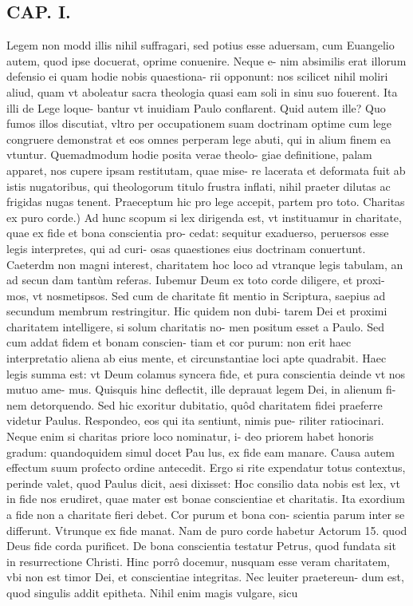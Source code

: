\documentclass{article}
\begin{document}
\begin{pages}
\section*{CAP. I. }
\marginpar{[ p.5]}\pstart Legem non modd illis nihil suffragari, sed potius esse aduersam, cum Euangelio autem, quod ipse docuerat, oprime conuenire. Neque e- nim absimilis erat illorum defensio ei quam hodie nobis quaestiona- rii opponunt: nos scilicet nihil moliri aliud, quam vt aboleatur sacra theologia quasi eam soli in sinu suo fouerent. Ita illi de Lege loque- bantur vt inuidiam Paulo conflarent. Quid autem ille? Quo fumos illos discutiat, vltro per occupationem suam doctrinam optime cum lege congruere demonstrat et eos omnes perperam lege abuti, qui in alium finem ea vtuntur. Quemadmodum hodie posita verae theolo- giae definitione, palam apparet, nos cupere ipsam restitutam, quae mise- re lacerata et deformata fuit ab istis nugatoribus, qui theologorum titulo frustra inflati, nihil praeter dilutas ac frigidas nugas tenent. Praeceptum hic pro lege accepit, partem pro toto.  \pend\pstart Charitas ex puro corde.) Ad hunc scopum si lex dirigenda est, vt instituamur in charitate, quae ex fide et bona conscientia pro- cedat: sequitur exaduerso, peruersos esse legis interpretes, qui ad curi- osas quaestiones eius doctrinam conuertunt. Caeterdm non magni interest, charitatem hoc loco ad vtranque legis tabulam, an ad secun dam tantùm referas. Iubemur Deum ex toto corde diligere, et proxi- mos, vt nosmetipsos. Sed cum de charitate fit mentio in Scriptura, saepius ad secundum membrum restringitur. Hic quidem non dubi- tarem Dei et proximi charitatem intelligere, si solum charitatis no- men positum esset a Paulo. Sed cum addat fidem et bonam conscien- tiam et cor purum: non erit haec interpretatio aliena ab eius mente, et circunstantiae loci apte quadrabit. Haec legis summa est: vt Deum colamus syncera fide, et pura conscientia deinde vt nos mutuo ame- mus. Quisquis hinc deflectit, ille deprauat legem Dei, in alienum fi- nem detorquendo. Sed hic exoritur dubitatio, quôd charitatem fidei praeferre videtur Paulus. Respondeo, eos qui ita sentiunt, nimis pue- riliter ratiocinari. Neque enim si charitas priore loco nominatur, i- deo priorem habet honoris gradum: quandoquidem simul docet Pau lus, ex fide eam manare. Causa autem effectum suum profecto ordine antecedit. Ergo si rite expendatur totus contextus, perinde valet, quod Paulus dicit, aesi dixisset: Hoc consilio data nobis est lex, vt in fide nos erudiret, quae mater est bonae conscientiae et charitatis. Ita exordium a fide non a charitate fieri debet. Cor purum et bona con- scientia parum inter se differunt. Vtrunque ex fide manat. Nam de puro corde habetur Actorum 15. quod Deus fide corda purificet. De bona conscientia testatur Petrus, quod fundata sit in resurrectione Christi. Hinc porrô docemur, nusquam esse veram charitatem, vbi non est timor Dei, et conscientiae integritas. Nec leuiter praetereun- dum est, quod singulis addit epitheta. Nihil enim magis vulgare, sicu  \pend

\end{pages}
\end{document}
